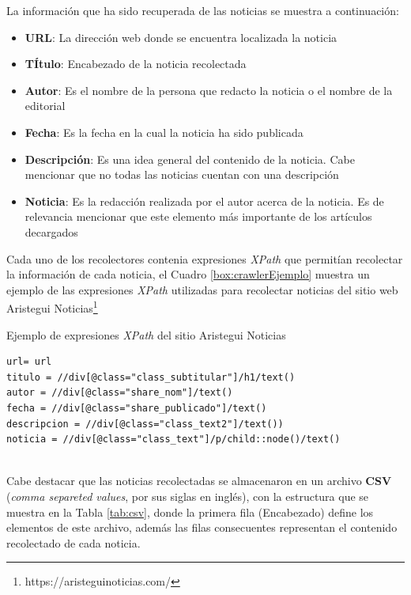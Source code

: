 La información que ha sido recuperada de las noticias se muestra a continuación:
\begin{itemize}
	\item \textbf{URL}: La dirección web donde se encuentra localizada la noticia 
	\item \textbf{TÍtulo}: Encabezado de la noticia recolectada
	\item \textbf{Autor}: Es el nombre de la persona que redacto la noticia o el nombre de la editorial
	\item \textbf{Fecha}: Es la fecha en la cual la noticia ha sido publicada
	\item \textbf{Descripción}: Es una idea general del contenido de la noticia. Cabe mencionar que no todas las noticias cuentan con una descripción
	\item \textbf{Noticia}: Es la redacción realizada por el autor acerca de la noticia. Es de relevancia mencionar que este elemento más importante de los artículos decargados 
\end{itemize}

Cada uno de los recolectores contenia expresiones \textit{XPath} que permitían recolectar la información de cada noticia, el Cuadro \ref{box:crawlerEjemplo} muestra un ejemplo de las expresiones \textit{XPath} utilizadas para recolectar noticias del sitio web Aristegui Noticias\footnote{https://aristeguinoticias.com/}\\

\begin{mygraybox}[label={box:crawlerEjemplo}]{Ejemplo de expresiones \textit{XPath} del sitio Aristegui Noticias}
\begin{small}
\begin{verbatim}
url= url
titulo = //div[@class="class_subtitular"]/h1/text()
autor = //div[@class="share_nom"]/text()
fecha = //div[@class="share_publicado"]/text()
descripcion = //div[@class="class_text2"]/text())
noticia = //div[@class="class_text"]/p/child::node()/text()
\end{verbatim}
\end{small}
\end{mygraybox}
\ \\
Cabe destacar que las noticias recolectadas se almacenaron en un archivo \textbf{CSV} (\textit{comma separeted values}, por sus siglas en inglés), con la estructura que se muestra en la Tabla \ref{tab:csv}, donde la primera fila (Encabezado) define los elementos de este archivo, además las filas consecuentes representan el contenido recolectado de cada noticia.\\

